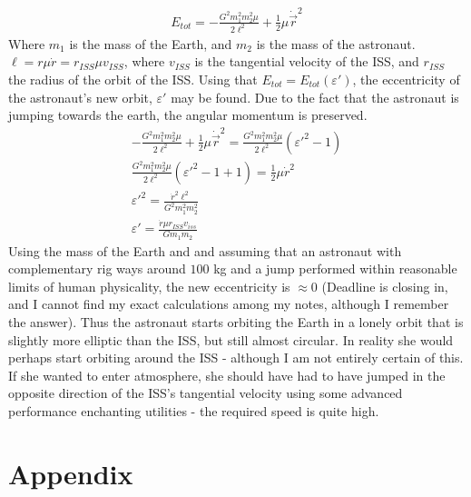 \documentclass[11pt,a4paper]{report}
\newcounter{excount}[chapter]
\newenvironment{exercise}[1][]{\addtocounter{excount}{1} \noindent {\bf Question
    \arabic{excount} \ \ #1}\hspace{2mm}}{\vspace{4mm}}
\begin{document}
\begin{exercise}{\bf Orbital motion\\}
\begin{itemize}
\begin{align*}
E_{tot}=-\frac{G^2 m_1^2m_2^2 \mu}{2 \ell^2}+\frac{1}{2}\mu \dot{\vec{r}}^2
\end{align*}
Where $m_1$ is the mass of the Earth, and $m_2$ is the mass of the astronaut. $\ell=r\mu\dot{r}=r_{ISS}\mu v_{ISS}$, where $v_{ISS}$ is the tangential velocity of the ISS, and $r_{ISS}$ the radius of the orbit of the ISS. Using that $E_{tot}=E_{tot}(\varepsilon')$, the eccentricity of the astronaut's new orbit, $\varepsilon'$ may be found. Due to the fact that the astronaut is jumping towards the earth, the angular momentum is preserved.
\begin{align*}
-\frac{G^2 m_1^2m_2^2 \mu}{2 \ell^2}+\frac{1}{2}\mu \dot{\vec{r}}^2=\frac{G^2m_1^2m_2^2 \mu}{2\ell^2}(\varepsilon'^2-1)\\
\frac{G^2m_1^2m_2^2 \mu}{2\ell^2}(\varepsilon'^2-1+1)=\frac{1}{2}\mu \dot{r}^2 \\
\varepsilon'^2=\frac{\dot{r}^2 \ell^2}{G^2 m_1^2 m_2^2}\\
\varepsilon'=\frac{\dot{r}\mu r_{ISS} v_{iss}}{Gm_1m_2}
\end{align*}
Using the mass of the Earth and and assuming that an astronaut with complementary rig ways around $100$ kg and a jump performed within reasonable limits of human physicality, the new eccentricity is $\approx 0$ (Deadline is closing in, and I cannot find my exact calculations among my notes, although I remember the answer). Thus the astronaut starts orbiting the Earth in a lonely orbit that is slightly more elliptic than the ISS, but still almost circular. In reality she would perhaps start orbiting around the ISS - although I am not entirely certain of this. If she wanted to enter atmosphere, she should have had to have jumped in the opposite direction of the ISS's tangential velocity using some advanced performance enchanting utilities - the required speed is quite high.
\end{itemize}
\end{exercise}



\section*{Appendix}
\end{document}
